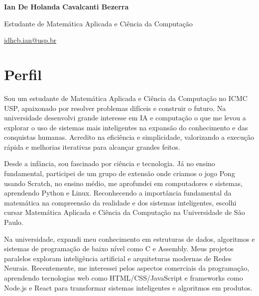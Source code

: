 \documentclass[a4paper,12pt]{article}
\begin{document}
\vspace*{-2cm}

\begin{center}
\Huge\textbf{Ian De Holanda Cavalcanti Bezerra}

\LARGE Estudante de Matemática Aplicada e Ciência da Computação

\large\href{mailto:idhcb.ian@usp.br}{idhcb.ian@usp.br}
\end{center}

\section*{Perfil}
\vspace{-0.5em}
\begin{multicols}{2}
\setlength{\columnsep}{0.4cm}
\setlength{\parindent}{0pt}
\setlength{\parskip}{0.15em}
\normalsize

Sou um estudante de Matemática Aplicada e Ciência da Computação no ICMC USP, apaixonado por resolver problemas difíceis e construir o futuro. Na universidade desenvolvi grande interesse em IA e computação o que me levou a explorar o uso de sistemas mais inteligentes na expansão do conhecimento e das conquistas humanas. Acredito na eficiência e simplicidade, valorizando a execução rápida e melhorias iterativas para alcançar grandes feitos.

Desde a infância, sou fascinado por ciência e tecnologia. Já no ensino fundamental, participei de um grupo de extensão onde criamos o jogo Pong usando Scratch, no ensino médio, me aprofundei em computadores e sistemas, aprendendo Python e Linux. Reconhecendo a importância fundamental da matemática na compreensão da realidade e dos sistemas inteligentes, escolhi cursar Matemática Aplicada e Ciência da Computação na Universidade de São Paulo.

Na universidade, expandi meu conhecimento em estruturas de dados, algoritmos e sistemas de programação de baixo nível como C e Assembly. Meus projetos paralelos exploram inteligência artificial e arquiteturas modernas de Redes Neurais. Recentemente, me interessei pelos aspectos comerciais da programação, aprendendo tecnologias web como HTML/CSS/JavaScript e frameworks como Node.js e React para transformar sistemas inteligentes e algoritmos em produtos.

\end{multicols}
\vspace{-0.5em}
\end{document}
